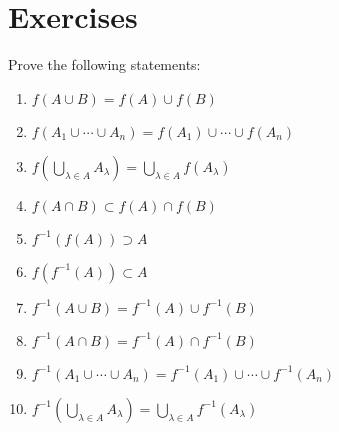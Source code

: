 \section*{Exercises}
\begin{exercise}
Prove the following statements:
\begin{enumerate}[label=(\roman*)]
\item $f(A\cup B)=f(A)\cup f(B)$
\item $f(A_1\cup\cdots\cup A_n)=f(A_1)\cup\cdots\cup f(A_n)$
\item $f(\bigcup_{\lambda\in A}A_\lambda)=\bigcup_{\lambda\in A}f(A_\lambda)$
\item $f(A\cap B)\subset f(A)\cap f(B)$
\item $f^{-1}(f(A))\supset A$
\item $f(f^{-1}(A))\subset A$
\item $f^{-1}(A\cup B)=f^{-1}(A)\cup f^{-1}(B)$
\item $f^{-1}(A\cap B)=f^{-1}(A)\cap f^{-1}(B)$
\item $f^{-1}(A_1\cup\cdots\cup A_n)=f^{-1}(A_1)\cup\cdots\cup f^{-1}(A_n)$
\item $f^{-1}(\bigcup_{\lambda\in A}A_\lambda)=\bigcup_{\lambda\in A}f^{-1}(A_\lambda)$
\end{enumerate}
\end{exercise}

